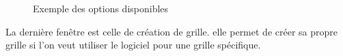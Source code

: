 \documentclass[12pt]{article}
\begin{document}
\begin{figure}[ht]
  \centering
  \qquad
  \caption{Exemple des options disponibles}
\end{figure}
\newpage
La dernière fenêtre est celle de création de grille. elle permet de créer sa propre grille si l'on veut utiliser le logiciel pour une grille spécifique. 
\end{document}
